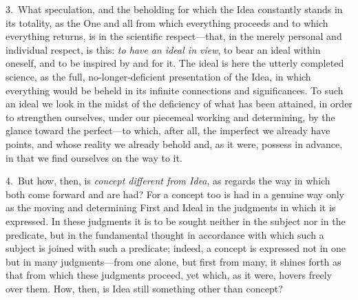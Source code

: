 \documentclass[12pt,a4paper]{book}
\begin{document}
3.~What speculation, and the beholding for which the Idea constantly stands in its
totality, as the One and all from which everything proceeds and to which everything
returns, is in the scientific respect---that, in the merely personal and individual
respect, is this: \emph{to have an ideal in view}, to bear an ideal within oneself, and
to be inspired by and for it. The ideal is here the utterly completed science, as the
full, no-longer-deficient presentation of the Idea, in which everything would be beheld
in its infinite connections and significances. To such an ideal we look in the midst of
the deficiency of what has been attained, in order to strengthen ourselves, under our
piecemeal working and determining, by the glance toward the perfect---to which, after
all, the imperfect we already have points, and whose reality we already behold and, as
it were, possess in advance, in that we find ourselves on the way to it.

4.~But how, then, is \emph{concept different from Idea}, as regards the way in which
both come forward and are had? For a concept too is had in a genuine way only as the
moving and determining First and Ideal in the judgments in which it is expressed. In
these judgments it is to be sought neither in the subject nor in the predicate, but in
the fundamental thought in accordance with which such a subject is joined with such a
predicate; indeed, a concept is expressed not in one but in many judgments---from one
alone, but first from many, it shines forth as that from which these judgments proceed,
yet which, as it were, hovers freely over them. How, then, is Idea still something other
than concept?
\end{document}
